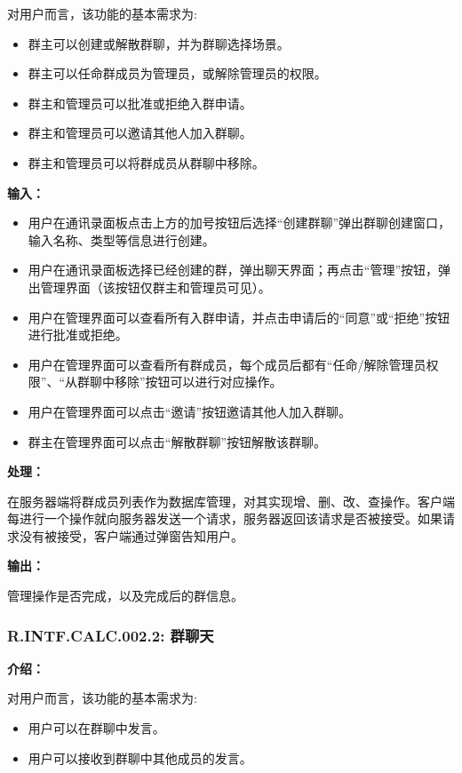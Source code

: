对用户而言，该功能的基本需求为:
\begin{itemize}
  \item 群主可以创建或解散群聊，并为群聊选择场景。
  \item 群主可以任命群成员为管理员，或解除管理员的权限。
  \item 群主和管理员可以批准或拒绝入群申请。
  \item 群主和管理员可以邀请其他人加入群聊。
  \item 群主和管理员可以将群成员从群聊中移除。
\end{itemize}

\textbf{输入：}

\begin{itemize}
  \item 用户在通讯录面板点击上方的加号按钮后选择“创建群聊”弹出群聊创建窗口，输入名称、类型等信息进行创建。
  \item 用户在通讯录面板选择已经创建的群，弹出聊天界面；再点击“管理”按钮，弹出管理界面（该按钮仅群主和管理员可见）。
  \item 用户在管理界面可以查看所有入群申请，并点击申请后的“同意”或“拒绝”按钮进行批准或拒绝。
  \item 用户在管理界面可以查看所有群成员，每个成员后都有“任命/解除管理员权限”、“从群聊中移除”按钮可以进行对应操作。
  \item 用户在管理界面可以点击“邀请”按钮邀请其他人加入群聊。
  \item 群主在管理界面可以点击“解散群聊”按钮解散该群聊。
\end{itemize}

\textbf{处理：}

在服务器端将群成员列表作为数据库管理，对其实现增、删、改、查操作。客户端每进行一个操作就向服务器发送一个请求，服务器返回该请求是否被接受。如果请求没有被接受，客户端通过弹窗告知用户。

\textbf{输出：}

管理操作是否完成，以及完成后的群信息。

\subsubsection{R.INTF.CALC.002.2: 群聊天}
\textbf{介绍：}

对用户而言，该功能的基本需求为:
\begin{itemize}
  \item 用户可以在群聊中发言。
  \item 用户可以接收到群聊中其他成员的发言。
\end{itemize}

